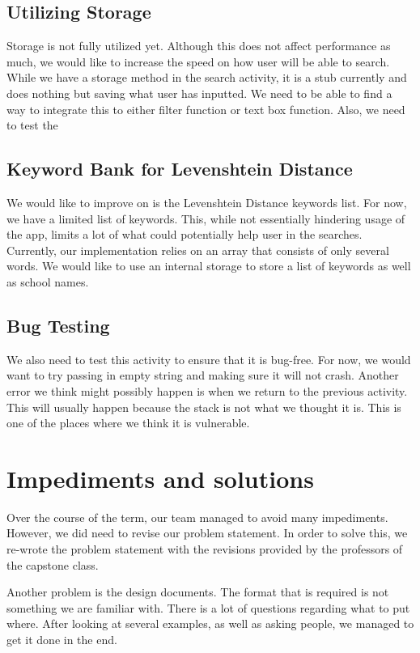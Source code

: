 \documentclass[journal,compsoc, 10pt, draftclsnofoot, onecolumn]{IEEEtran}
\begin{document}
\subsection{Utilizing Storage}
Storage is not fully utilized yet. Although this does not affect performance as much, we would like to increase the speed on how user will be able to search. While we have a storage method in the search activity, it is a stub currently and does nothing but saving what user has inputted. We need to be able to find a way to integrate this to either filter function or text box function. Also, we need to test the 

\subsection{Keyword Bank for Levenshtein Distance}
We would like to improve on is the Levenshtein Distance keywords list. For now, we have a limited list of keywords. This, while not essentially hindering usage of the app, limits a lot of what could potentially help user in the searches. Currently, our implementation relies on an array that consists of only several words. We would like to use an internal storage to store a list of keywords as well as school names.

\subsection{Bug Testing}
We also need to test this activity to ensure that it is bug-free. For now, we would want to try passing in empty string and making sure it will not crash. Another error we think might possibly happen is when we return to the previous activity. This will usually happen because the stack is not what we thought it is. This is one of the places where we think it is vulnerable.

\section{Impediments and solutions}
Over the course of the term, our team managed to avoid many impediments. However, 
we did need to revise our problem statement. In order to solve this, we re-wrote the 
problem statement with the revisions provided by the professors of the capstone 
class. \newline

Another problem is the design documents. The format that is required is not 
something we are familiar with. There is a lot of questions regarding what to 
put where. After looking at several examples, as well as asking people, 
we managed to get it done in the end.\newline
\end{document}
